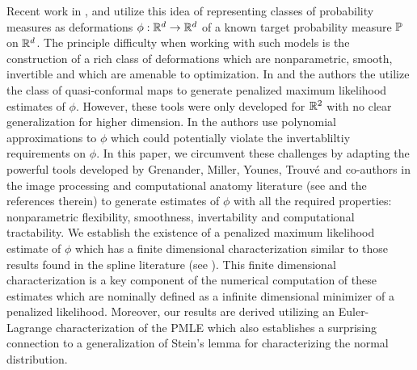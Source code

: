 \documentclass[noinfoline]{imsart}
\begin{document}
 
% 
%
  Recent work in \cite{and:11}, \cite{AnderesNychka} and  \cite{ElMoselhy20127815} utilize  this idea of representing classes of  probability measures as deformations $\phi:\Bbb R^d\rightarrow \Bbb R^d$ of a known target probability measure $\Bbb P$ on $\Bbb R^d$. 
 The principle difficulty when working with such models is the construction of a rich class of deformations   which are nonparametric, smooth,  invertible and which are amenable to optimization. In \cite{and:11} and \cite{AnderesNychka} the authors the utilize  the class of quasi-conformal maps to generate penalized maximum likelihood estimates of $\phi$. However, these tools were only developed for $\Bbb R^2$ with no clear generalization for higher dimension. 
 In \cite{ElMoselhy20127815} the authors use polynomial approximations to $\phi$ which could potentially violate the invertabliltiy requirements on $\phi$.
In this paper,  we circumvent these challenges by adapting the powerful tools developed by Grenander, Miller,  Younes, Trouv\'e and co-authors in the image processing and computational anatomy literature   (see \cite{you:10} and the references therein) to generate estimates of  $\phi$ with all the required properties: nonparametric flexibility, smoothness, invertability and computational tractability. 
We establish the existence of a penalized maximum likelihood estimate of $\phi$  which has a finite dimensional characterization  similar to those results found in the spline literature (see \cite{wahba:90}). This finite dimensional characterization is a key component  of the numerical computation of these estimates which are nominally defined as a infinite  dimensional minimizer of a penalized likelihood. Moreover, our results are derived utilizing  an Euler-Lagrange characterization of the PMLE which also establishes a surprising connection to a generalization of Stein's lemma for characterizing the normal distribution.
\end{document}
